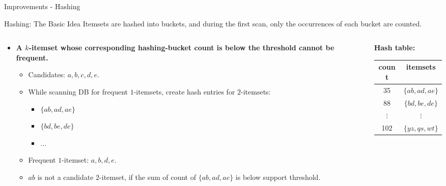 \begin{frame}{Improvements - Hashing}
	\begin{block}{Hashing: The Basic Idea}
		Itemsets are hashed into buckets, and during the first scan, only the occurrences of each bucket are counted.
	\end{block}

	\begin{columns}[c]
		\begin{column}{0.6\textwidth}
			\begin{itemize}
				\item \textbf{A $k$-itemset whose corresponding hashing-bucket
					      count is below the threshold cannot be frequent.}
				      \begin{itemize}
					      \item Candidates: $a,b,c,d,e$.
					      \item While scanning DB for frequent $1$-itemsets, create
					            hash entries for $2$-itemsets:
					            \begin{itemize}
						            \item $\{ab,ad,ae\}$
						            \item $\{bd,be,de\}$
						            \item $\ldots$
					            \end{itemize}
					      \item Frequent $1$-itemset: $a,b,d,e$.
					      \item $ab$ is not a candidate $2$-itemset, if the sum of
					            count of $\{ab, ad, ae\}$ is below support threshold.
				      \end{itemize}
			\end{itemize}
		\end{column}
		\begin{column}{0.3\textwidth}
			\centering
			\textbf{Hash table:}\\
			\begin{tabular}{| c | c |}
				\hline
				count    & itemsets       \\\hline
				35       & $\{ab,ad,ae\}$ \\\hline
				88       & $\{bd,be,de\}$ \\\hline
				$\vdots$ & $\vdots$       \\\hline
				102      & $\{yz,qs,wt\}$ \\\hline
			\end{tabular}
		\end{column}
	\end{columns}
\end{frame}

